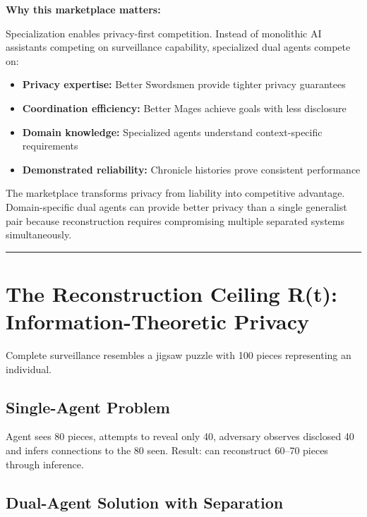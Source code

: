 \documentclass[
]{article}
\begin{document}
\textbf{Why this marketplace matters:}

Specialization enables privacy-first competition. Instead of monolithic
AI assistants competing on surveillance capability, specialized dual
agents compete on:

\begin{itemize}
\item
  \textbf{Privacy expertise:} Better Swordsmen provide tighter privacy
  guarantees
\item
  \textbf{Coordination efficiency:} Better Mages achieve goals with less
  disclosure
\item
  \textbf{Domain knowledge:} Specialized agents understand
  context-specific requirements
\item
  \textbf{Demonstrated reliability:} Chronicle histories prove
  consistent performance
\end{itemize}

The marketplace transforms privacy from liability into competitive
advantage. Domain-specific dual agents can provide better privacy than a
single generalist pair because reconstruction requires compromising
multiple separated systems simultaneously.

\begin{center}\rule{0.5\linewidth}{0.5pt}\end{center}

\section{The Reconstruction Ceiling R(t): Information-Theoretic
Privacy}\label{the-reconstruction-ceiling-rt-information-theoretic-privacy}

Complete surveillance resembles a jigsaw puzzle with 100 pieces
representing an individual.

\subsection{Single-Agent Problem}\label{single-agent-problem}

Agent sees 80 pieces, attempts to reveal only 40, adversary observes
disclosed 40 and infers connections to the 80 seen. Result: can
reconstruct 60--70 pieces through inference.

\subsection{Dual-Agent Solution with
Separation}\label{dual-agent-solution-with-separation}
\end{document}
